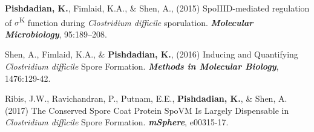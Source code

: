 \documentclass[letterpaper,hidelinks]{scrartcl}
\begin{document}
\begin{list1}
\item \textbf{Pishdadian, K.}, Fimlaid, K.A., \& Shen, A., (2015) SpoIIID-mediated regulation of $\sigma$\textsuperscript{K} function during \emph{Clostridium difficile} sporulation. \textbf{\emph{Molecular Microbiology}}, 95:189--208.
\item Shen, A., Fimlaid, K.A., \& \textbf{Pishdadian, K.}, (2016) Inducing and Quantifying \emph{Clostridium difficile} Spore Formation. \textbf{\emph{Methods in Molecular Biology}}, 1476:129-42.
\item Ribis, J.W., Ravichandran, P., Putnam, E.E., \textbf{Pishdadian, K.}, \& Shen, A. (2017) The Conserved Spore Coat Protein SpoVM Is Largely Dispensable in \emph{Clostridium difficile} Spore Formation. \textbf{\emph{mSphere}}, e00315-17.
\end{list1}

%
%
\end{document}
